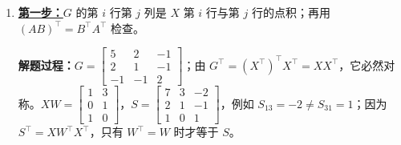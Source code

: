 \begin{enumerate}[label={},leftmargin=4.8em,itemsep=4pt]
\item[\textbf{C-032.}] \leavevmode{}\label{solution:C-032}\label{solution:gram-asymmetry}\hyperref[exercise:gram-asymmetry]{\textbf{第一步：}}$G$ 的第 $i$ 行第 $j$ 列是 $X$ 第 $i$ 行与第 $j$ 行的点积；再用 $(AB)^\top=B^\top A^\top$ 检查。\par\nobreak
\textbf{解题过程：}$G=\begin{bmatrix}5&2&-1\\2&1&-1\\-1&-1&2\end{bmatrix}$；由 $G^\top=(X^\top)^\top X^\top=XX^\top$，它必然对称。$XW=\begin{bmatrix}1&3\\0&1\\1&0\end{bmatrix}$，$S=\begin{bmatrix}7&3&-2\\2&1&-1\\1&0&1\end{bmatrix}$，例如 $S_{13}=-2\neq S_{31}=1$；因为 $S^\top=XW^\top X^\top$，只有 $W^\top=W$ 时才等于 $S$。
\end{enumerate}

